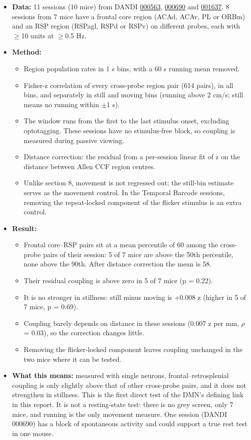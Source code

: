 \documentclass[10pt,a4paper]{article}
\begin{document}
\begin{itemize}
\item \textbf{Data:} 11 sessions (10 mice) from DANDI \href{https://dandiarchive.org/dandiset/000563}{000563}, \href{https://dandiarchive.org/dandiset/000690}{000690} and \href{https://dandiarchive.org/dandiset/001637}{001637}. 8 sessions from 7 mice have a frontal core region (ACAd, ACAv, PL or ORBm) and an RSP region (RSPagl, RSPd or RSPv) on different probes, each with $\geq$10 units at $\geq$0.5 Hz.
\item \textbf{Method:} 
\begin{itemize}
\item Region population rates in 1 s bins, with a 60 s running mean removed.
\item Fisher-z correlation of every cross-probe region pair (614 pairs), in all bins, and separately in still and moving bins (running above 2 cm/s; still means no running within $\pm$1 s).
\item The window runs from the first to the last stimulus onset, excluding optotagging. These sessions have no stimulus-free block, so coupling is measured during passive viewing.
\item Distance correction: the residual from a per-session linear fit of z on the distance between Allen CCF region centres.
\item Unlike section 8, movement is not regressed out; the still-bin estimate serves as the movement control. In the Temporal Barcode sessions, removing the repeat-locked component of the flicker stimulus is an extra control.
\end{itemize}
\item \textbf{Result:} 
\begin{itemize}
\item Frontal core--RSP pairs sit at a mean percentile of 60 among the cross-probe pairs of their session: 5 of 7 mice are above the 50th percentile, none above the 90th. After distance correction the mean is 58.
\item Their residual coupling is above zero in 5 of 7 mice (p = 0.22).
\item It is no stronger in stillness: still minus moving is +0.008 z (higher in 5 of 7 mice, p = 0.69).
\item Coupling barely depends on distance in these sessions (0.007 z per mm, $\rho$ = 0.03), so the correction changes little.
\item Removing the flicker-locked component leaves coupling unchanged in the two mice where it can be tested.
\end{itemize}
\item \textbf{What this means:} measured with single neurons, frontal--retrosplenial coupling is only slightly above that of other cross-probe pairs, and it does not strengthen in stillness. This is the first direct test of the DMN's defining link in this report. It is not a resting-state test: there is no grey screen, only 7 mice, and running is the only movement measure. One session (DANDI 000690) has a block of spontaneous activity and could support a true rest test in one mouse.
\end{itemize}
\end{document}
